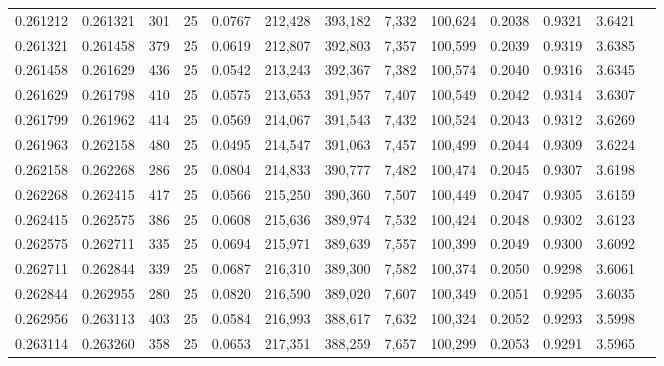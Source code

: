 \begin{tabular}{rrrrrrrrrrrrr}
0.261212 & 0.261321 &   301 &  25 &                                     0.0767 & 212,428 & 393,182 &   7,332 & 100,624 & 0.2038 & 0.9321 & 3.6421 \\
0.261321 & 0.261458 &   379 &  25 &                                     0.0619 & 212,807 & 392,803 &   7,357 & 100,599 & 0.2039 & 0.9319 & 3.6385 \\
0.261458 & 0.261629 &   436 &  25 &                                     0.0542 & 213,243 & 392,367 &   7,382 & 100,574 & 0.2040 & 0.9316 & 3.6345 \\
0.261629 & 0.261798 &   410 &  25 &                                     0.0575 & 213,653 & 391,957 &   7,407 & 100,549 & 0.2042 & 0.9314 & 3.6307 \\
0.261799 & 0.261962 &   414 &  25 &                                     0.0569 & 214,067 & 391,543 &   7,432 & 100,524 & 0.2043 & 0.9312 & 3.6269 \\
0.261963 & 0.262158 &   480 &  25 &                                     0.0495 & 214,547 & 391,063 &   7,457 & 100,499 & 0.2044 & 0.9309 & 3.6224 \\
0.262158 & 0.262268 &   286 &  25 &                                     0.0804 & 214,833 & 390,777 &   7,482 & 100,474 & 0.2045 & 0.9307 & 3.6198 \\
0.262268 & 0.262415 &   417 &  25 &                                     0.0566 & 215,250 & 390,360 &   7,507 & 100,449 & 0.2047 & 0.9305 & 3.6159 \\
0.262415 & 0.262575 &   386 &  25 &                                     0.0608 & 215,636 & 389,974 &   7,532 & 100,424 & 0.2048 & 0.9302 & 3.6123 \\
0.262575 & 0.262711 &   335 &  25 &                                     0.0694 & 215,971 & 389,639 &   7,557 & 100,399 & 0.2049 & 0.9300 & 3.6092 \\
0.262711 & 0.262844 &   339 &  25 &                                     0.0687 & 216,310 & 389,300 &   7,582 & 100,374 & 0.2050 & 0.9298 & 3.6061 \\
0.262844 & 0.262955 &   280 &  25 &                                     0.0820 & 216,590 & 389,020 &   7,607 & 100,349 & 0.2051 & 0.9295 & 3.6035 \\
0.262956 & 0.263113 &   403 &  25 &                                     0.0584 & 216,993 & 388,617 &   7,632 & 100,324 & 0.2052 & 0.9293 & 3.5998 \\
0.263114 & 0.263260 &   358 &  25 &                                     0.0653 & 217,351 & 388,259 &   7,657 & 100,299 & 0.2053 & 0.9291 & 3.5965 \\

\end{tabular}

